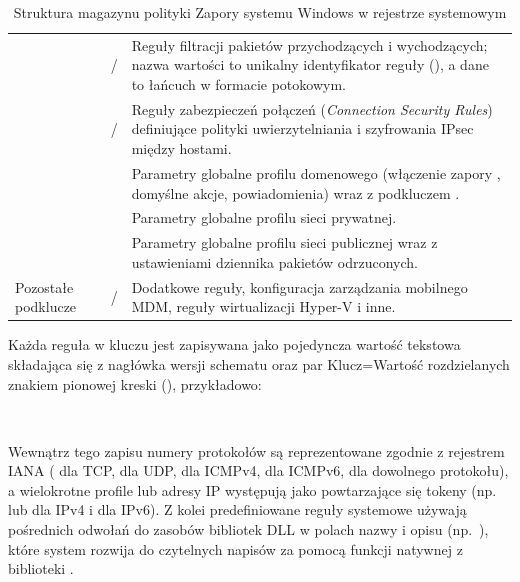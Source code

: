 \begin{table}[H]
    \centering
    \caption{Struktura magazynu polityki Zapory systemu Windows w rejestrze systemowym}\label{tab:rejestr-zapory}
    \tablefont
    \begin{tabularx}{\linewidth}{L{3.8cm} L{2.9cm} Y}
        \toprule
         &  &  \\
        \midrule
         &  /  & Reguły filtracji pakietów przychodzących i wychodzących; nazwa wartości to unikalny identyfikator reguły (), a dane to łańcuch w formacie potokowym. \\
         &  /  & Reguły zabezpieczeń połączeń (\textit{Connection Security Rules}) definiujące polityki uwierzytelniania i szyfrowania IPsec między hostami. \\
         &  & Parametry globalne profilu domenowego (włączenie zapory , domyślne akcje, powiadomienia) wraz z podkluczem . \\
         &  & Parametry globalne profilu sieci prywatnej. \\
         &  & Parametry globalne profilu sieci publicznej wraz z ustawieniami dziennika pakietów odrzuconych. \\
        Pozostałe podklucze &  /  & Dodatkowe reguły, konfiguracja zarządzania mobilnego MDM, reguły wirtualizacji Hyper-V i inne. \\
        \bottomrule
    \end{tabularx}
\end{table}

Każda reguła w kluczu  jest zapisywana jako pojedyncza wartość tekstowa składająca się z nagłówka wersji schematu oraz par Klucz=Wartość rozdzielanych znakiem pionowej kreski (\code{|}), przykładowo:
\begin{center}
    {\footnotesize{}}\\[-2pt]
    {\footnotesize{}}
\end{center}
Wewnątrz tego zapisu numery protokołów są reprezentowane zgodnie z rejestrem IANA ( dla TCP,  dla UDP,  dla ICMPv4,  dla ICMPv6,  dla dowolnego protokołu), a wielokrotne profile lub adresy IP występują jako powtarzające się tokeny (np.\  lub  dla IPv4 i  dla IPv6). Z kolei predefiniowane reguły systemowe używają pośrednich odwołań do zasobów bibliotek DLL w polach nazwy i opisu (np.\ ), które system rozwija do czytelnych napisów za pomocą funkcji natywnej  z biblioteki .

